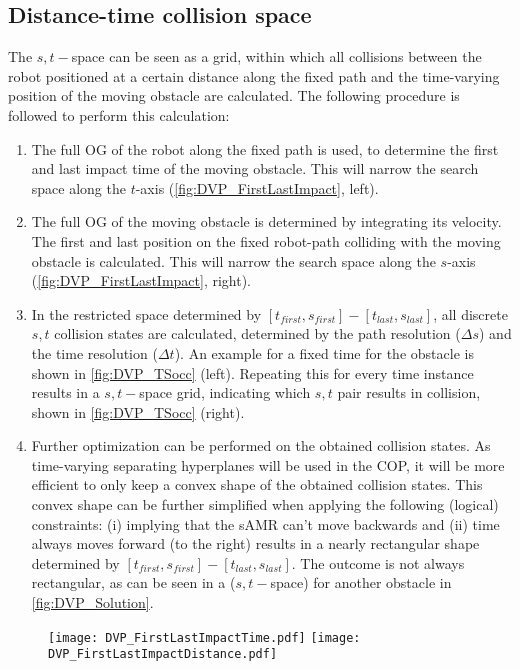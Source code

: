 \subsection{Distance-time collision space} \label{sec:STspace}
The $s,t-$space can be seen as a grid, within which all collisions between the robot positioned at a certain distance along the fixed path and the time-varying position of the moving obstacle are calculated. The following procedure is followed to perform this calculation:
\begin{enumerate}
\item The full OG of the robot along the fixed path is used, to determine the first and last impact time of the moving obstacle. This will narrow the search space along the $t$-axis (\cref{fig:DVP_FirstLastImpact}, left).
\item The full OG of the moving obstacle is determined by integrating its velocity. The first and last position on the fixed robot-path colliding with the moving obstacle is calculated. This will narrow the search space along the $s$-axis (\cref{fig:DVP_FirstLastImpact}, right).
\item In the restricted space determined by $[t_{first},s_{first}]-[t_{last},s_{last}]$, all discrete $s,t$ collision states are calculated, determined by the path resolution ($\Delta s$) and the time resolution ($\Delta t$). An example for a fixed time for the obstacle is shown in \cref{fig:DVP_TSocc} (left). Repeating this for every time instance results in a $s,t-$space grid, indicating which $s,t$ pair results in collision, shown in \cref{fig:DVP_TSocc} (right).
\item Further optimization can be performed on the obtained collision states. As time-varying separating hyperplanes will be used in the COP, it will be more efficient to only keep a convex shape of the obtained collision states. This convex shape can be further simplified when applying the following (logical) constraints: (i) implying that the sAMR can't move backwards and (ii) time always moves forward (to the right) results in a nearly rectangular shape determined by $[t_{first},s_{first}]-[t_{last},s_{last}]$. The outcome is not always rectangular, as can be seen in a ($s,t-$space) for another obstacle in \cref{fig:DVP_Solution}.
\end{enumerate}

\begin{figure}[!htbp]
\centering
\texttt{[image: DVP\_FirstLastImpactTime.pdf]}
\hfill
\texttt{[image: DVP\_FirstLastImpactDistance.pdf]}
\end{figure}

